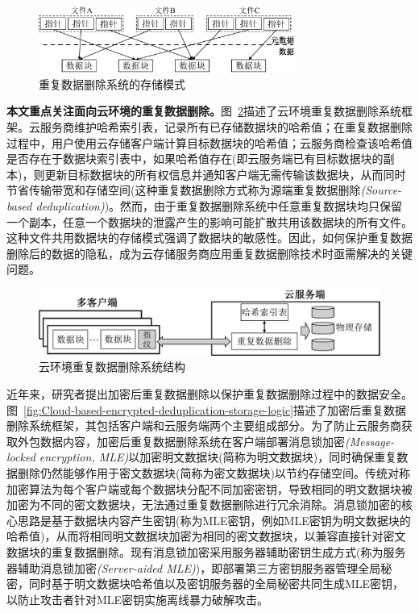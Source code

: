 \begin{figure}[!htb]
    \small
    \centering
    \includegraphics[width=0.75\textwidth]{pic/background/dedupOverview.pdf}
    \caption{重复数据删除系统的存储模式}
    \label{fig:Deduplication-storage-pattern}
\end{figure}

\textbf{本文重点关注面向云环境的重复数据删除。}图~\ref{fig:Cloud-based-deduplication-storage-logic}描述了云环境重复数据删除系统框架。云服务商维护哈希索引表，记录所有已存储数据块的哈希值；在重复数据删除过程中，用户使用云存储客户端计算目标数据块的哈希值；云服务商检查该哈希值是否存在于数据块索引表中，如果哈希值存在(即云服务端已有目标数据块的副本)，则更新目标数据块的所有权信息并通知客户端无需传输该数据块，从而同时节省传输带宽和存储空间(这种重复数据删除方式称为源端重复数据删除\textit{(Source-based deduplication)})。然而，由于重复数据删除系统中任意重复数据块均只保留一个副本，任意一个数据块的泄露产生的影响可能扩散共用该数据块的所有文件。这种文件共用数据块的存储模式强调了数据块的敏感性。因此，如何保护重复数据删除后的数据的隐私，成为云存储服务商应用重复数据删除技术时亟需解决的关键问题。

\begin{figure}[!htb]
    \small
    \centering
    \includegraphics[width=\textwidth]{pic/background/Cloud-deduplication.pdf}
    \caption{云环境重复数据删除系统结构}
    \label{fig:Cloud-based-deduplication-storage-logic}
\end{figure}
近年来，研究者提出加密后重复数据删除\cite{bellare2013MLE}以保护重复数据删除过程中的数据安全。图~\ref{fig:Cloud-based-encrypted-deduplication-storage-logic}描述了加密后重复数据删除系统框架，其包括客户端和云服务端两个主要组成部分。为了防止云服务商获取外包数据内容，加密后重复数据删除系统在客户端部署消息锁加密\textit{(Message-locked encryption, MLE)}\cite{bellare2013MLE}以加密明文数据块(简称为明文数据块)，同时确保重复数据删除仍然能够作用于密文数据块(简称为密文数据块)以节约存储空间。传统对称加密算法为每个客户端或每个数据块分配不同加密密钥，导致相同的明文数据块被加密为不同的密文数据块，无法通过重复数据删除进行冗余消除。消息锁加密的核心思路是基于数据块内容产生密钥(称为MLE密钥，例如MLE密钥为明文数据块的哈希值\cite{douceur2002reclaiming})，从而将相同明文数据块加密为相同的密文数据块，以兼容直接针对密文数据块的重复数据删除。现有消息锁加密采用服务器辅助密钥生成方式(称为服务器辅助消息锁加密\textit{(Server-aided MLE)}\cite{bellare2013DupLESS})，即部署第三方密钥服务器管理全局秘密，同时基于明文数据块哈希值以及密钥服务器的全局秘密共同生成MLE密钥，以防止攻击者针对MLE密钥实施离线暴力破解攻击。

